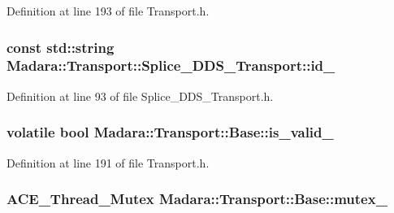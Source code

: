 Definition at line 193 of file Transport.h.

\hypertarget{classMadara_1_1Transport_1_1Splice__DDS__Transport_af85f76783ac455c788ddeb62505b40c9}{
\subsubsection[{id\_\-}]{\setlength{\rightskip}{0pt plus 5cm}const std::string {\bf Madara::Transport::Splice\_\-DDS\_\-Transport::id\_\-}}}
\label{d0/d91/classMadara_1_1Transport_1_1Splice__DDS__Transport_af85f76783ac455c788ddeb62505b40c9}


Definition at line 93 of file Splice\_\-DDS\_\-Transport.h.

\hypertarget{classMadara_1_1Transport_1_1Base_a77696ae1c39c0d0edc169882c4b82c23}{
\subsubsection[{is\_\-valid\_\-}]{\setlength{\rightskip}{0pt plus 5cm}volatile bool {\bf Madara::Transport::Base::is\_\-valid\_\-}}}
\label{dc/d97/classMadara_1_1Transport_1_1Base_a77696ae1c39c0d0edc169882c4b82c23}


Definition at line 191 of file Transport.h.

\hypertarget{classMadara_1_1Transport_1_1Base_a81479f3b01798d0836dc44629c904450}{
\subsubsection[{mutex\_\-}]{\setlength{\rightskip}{0pt plus 5cm}ACE\_\-Thread\_\-Mutex {\bf Madara::Transport::Base::mutex\_\-}}}
\label{dc/d97/classMadara_1_1Transport_1_1Base_a81479f3b01798d0836dc44629c904450}


